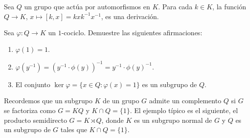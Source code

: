 \begin{example}
	Sea $Q$ un grupo que actúa por automorfismos en $K$. Para cada $k\in K$, la
	función $Q\to K$, $x\mapsto [k,x]=kxk^{-1}x^{-1}$, es una derivación.
\end{example}


\begin{exercise}
	\label{exercise:1cocycle}
	Sea $\varphi\colon Q\to K$ un $1$-cociclo. Demuestre las siguientes afirmaciones:
	\begin{enumerate}
		\item $\varphi(1)=1$.
		\item $\varphi(y^{-1})=(y^{-1}\cdot\phi(y))^{-1}=y^{-1}\cdot\phi(y)^{-1}$.
		\item El conjunto $\ker\varphi=\{x\in Q:\varphi(x)=1\}$ 	es un
			subgrupo de $Q$. 
	\end{enumerate}
\end{exercise}

	

Recordemos que un subgrupo $K$ de un grupo $G$ admite un complemento $Q$ si 
$G$ se factoriza como 
$G=KQ$ y $K\cap Q=\{1\}$. 
El ejemplo típico es el siguiente, el producto semidirecto $G=K\rtimes Q$, donde $K$ es un subgrupo
normal de $G$ y $Q$ es un subgrupo de $G$ tales que $K\cap Q=\{1\}$. 

